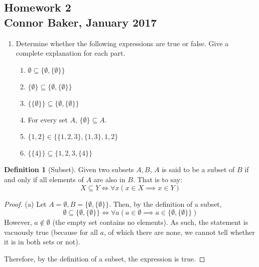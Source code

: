 \documentclass[10pt]{article}
\theoremstyle{definition}
\newtheorem{definition}[equation]{Definition}
\theoremstyle{plain}
\begin{document}
\begin{center}
  \subsection*{Homework 2\\Connor Baker, January 2017}
\end{center}

\begin{enumerate}
\item Determine whether the following expressions are true or false.  Give a complete explanation for each part.
  \begin{enumerate}
  \item $\emptyset \subseteq \{\emptyset, \{ \emptyset \} \}$
  \item $\{\emptyset\} \subseteq \{\emptyset, \{ \emptyset \} \}$
  \item $\{\{\emptyset\}\} \subseteq \{\emptyset, \{ \emptyset \} \}$
  \item For every set $A$, $\{\emptyset\} \subseteq A.$
  \item $\{1,2\} \in \{\{1,2,3\},\{1,3\}, 1, 2\}$
  \item $\{\{4\}\} \subseteq \{1,2,3,\{4\}\}$
  \end{enumerate}
\end{enumerate}

\begin{definition}[Subset]
  Given two subsets $A,B$, $A$ is said to be a subset of $B$ if and only if all elements of $A$ are also in $B$. That is to say:
  \begin{equation*}
    X \subseteq Y \iff \forall x(x\in X \implies x\in Y)
  \end{equation*}
\end{definition}

\begin{proof}{(a)}
  Let $A=\emptyset, B = \{\emptyset,\{\emptyset\}\}$. Then, by the definition of a subset,
  \begin{equation*}
    \emptyset \subseteq \{\emptyset,\{\emptyset\}\} \iff \forall a(a\in \emptyset \implies a\in \{\emptyset,\{\emptyset\}\})
  \end{equation*}
  However, $a\not\in\emptyset$ (the empty set contains no elements). As such, the statement is vacuously true (because for all $a$, of which there are none, we cannot tell whether it is in both sets or not). \\

  \par Therefore, by the definition of a subset, the expression is true.
\end{proof}
\end{document}
